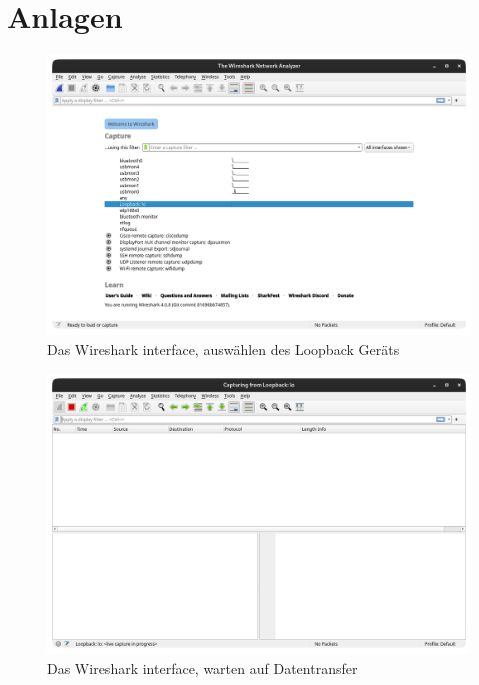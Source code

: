 \documentclass[12pt]{article}
\begin{document}
\centering
\vspace*{200pt}
\Huge{\section{Anlagen}}
\newpage

\begin{figure}[h]
	\centering
	\includegraphics[scale=0.3]{Bilder/Anlagen_1}
	\caption{Das Wireshark interface, auswählen des Loopback Geräts \cite{screenshots-self}}
	\label{fig:figure30}
\end{figure}

\begin{figure}[h]
	\centering
	\includegraphics[scale=0.3]{Bilder/Anlagen_2}
	\caption{Das Wireshark interface, warten auf Datentransfer \cite{screenshots-self}}
	\label{fig:figure31}
\end{figure}
\end{document}
